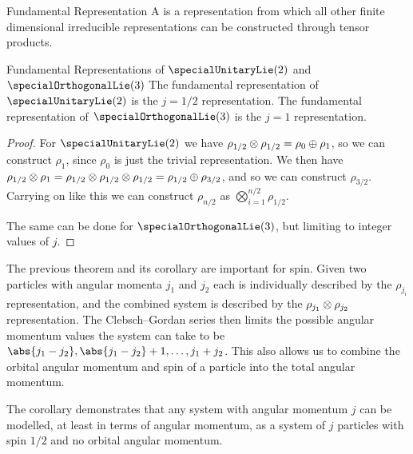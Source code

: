 \begin{dfn}{Fundamental Representation}{}
    A  is a representation from which all other finite dimensional irreducible representations can be constructed through tensor products.
\end{dfn}

\begin{crl}{Fundamental Representations of \(\specialUnitaryLie(2)\) and \(\specialOrthogonalLie(3)\)}{}
    The fundamental representation of \(\specialUnitaryLie(2)\) is the \(j = 1/2\) representation.
    The fundamental representation of \(\specialOrthogonalLie(3)\) is the \(j = 1\) representation.
    \begin{proof}
        For \(\specialUnitaryLie(2)\) we have \(\rho_{1/2} \otimes \rho_{1/2} = \rho_{0} \oplus \rho_{1}\), so we can construct \(\rho_1\), since \(\rho_{0}\) is just the trivial representation.
        We then have \(\rho_{1/2} \otimes \rho_{1} = \rho_{1/2} \otimes \rho_{1/2} \otimes \rho_{1/2} = \rho_{1/2} \oplus \rho_{3/2}\), and so we can construct \(\rho_{3/2}\).
        Carrying on like this we can construct \(\rho_{n/2}\) as \(\bigotimes_{i = 1}^{n/2} \rho_{1/2}\).
        
        The same can be done for \(\specialOrthogonalLie(3)\), but limiting to integer values of \(j\).
    \end{proof}
\end{crl}

\begin{exm}{}{}
    The previous theorem and its corollary are important for spin.
    Given two particles with angular momenta \(j_1\) and \(j_2\) each is individually described by the \(\rho_{j_i}\) representation, and the combined system is described by the \(\rho_{j_1} \otimes \rho_{j_2}\) representation.
    The Clebsch--Gordan series then limits the possible angular momentum values the system can take to be \(\abs{j_1 - j_2}, \abs{j_1 - j_2} + 1, \dotsc, j_1 + j_2\).
    This also allows us to combine the orbital angular momentum and spin of a particle into the total angular momentum.
    
    The corollary demonstrates that any system with angular momentum \(j\) can be modelled, at least in terms of angular momentum, as a system of \(j\) particles with spin \(1/2\) and no orbital angular momentum.
\end{exm}

